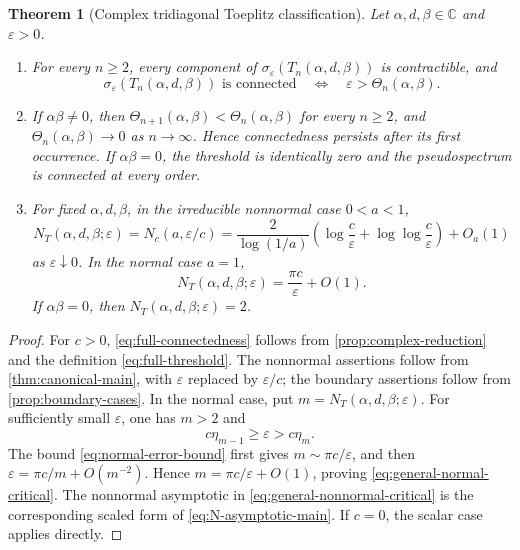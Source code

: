 \documentclass[11pt,a4paper]{article}
\numberwithin{equation}{section}
\newtheorem{theorem}{Theorem}[section]
\newcommand{\C}{\mathbb C}
\begin{document}
\begin{theorem}[Complex tridiagonal Toeplitz classification]
\label{thm:main}
Let \(\alpha,d,\beta\in\C\) and \(\varepsilon>0\).
\begin{enumerate}
\item For every \(n\geq2\), every component of
\(\sigma_\varepsilon(T_n(\alpha,d,\beta))\) is
contractible, and
\begin{equation}\label{eq:full-connectedness}
 \sigma_\varepsilon(T_n(\alpha,d,\beta))\text{ is connected}
 \quad\Longleftrightarrow\quad \varepsilon>\Theta_n(\alpha,\beta).
\end{equation}
\item If \(\alpha\beta\ne0\), then
\(\Theta_{n+1}(\alpha,\beta)<\Theta_n(\alpha,\beta)\) for every \(n\geq2\),
and \(\Theta_n(\alpha,\beta)\to0\) as \(n\to\infty\).  Hence connectedness
persists after its first occurrence.  If \(\alpha\beta=0\), the threshold is
identically zero and the pseudospectrum is connected at every order.
\item For fixed \(\alpha,d,\beta\), in the irreducible nonnormal case
\(0<a<1\),
\begin{equation}\label{eq:general-nonnormal-critical}
 N_T(\alpha,d,\beta;\varepsilon)=N_c(a,\varepsilon/c)
 =\frac{2}{\log(1/a)}
 \left(\log\frac c\varepsilon+
 \log\!\log\frac c\varepsilon\right)+O_a(1)
\end{equation}
as \(\varepsilon\downarrow0\).  In the normal case \(a=1\),
\begin{equation}\label{eq:general-normal-critical}
 N_T(\alpha,d,\beta;\varepsilon)
 =\frac{\pi c}{\varepsilon}+O(1).
\end{equation}
If \(\alpha\beta=0\), then \(N_T(\alpha,d,\beta;\varepsilon)=2\).
\end{enumerate}
\end{theorem}

\begin{proof}
For \(c>0\), \eqref{eq:full-connectedness} follows from
\cref{prop:complex-reduction} and the definition
\eqref{eq:full-threshold}.  The nonnormal assertions follow from
\cref{thm:canonical-main}, with \(\varepsilon\) replaced by
\(\varepsilon/c\); the boundary assertions follow from
\cref{prop:boundary-cases}.  In the normal case, put
\(m=N_T(\alpha,d,\beta;\varepsilon)\).  For sufficiently small
\(\varepsilon\), one has \(m>2\) and
\[
 c\eta_{m-1}\geq\varepsilon>c\eta_m.
\]
The bound \eqref{eq:normal-error-bound} first gives
\(m\sim\pi c/\varepsilon\), and then
\(\varepsilon=\pi c/m+O(m^{-2})\).  Hence
\(m=\pi c/\varepsilon+O(1)\), proving
\eqref{eq:general-normal-critical}.  The nonnormal asymptotic in
\eqref{eq:general-nonnormal-critical} is the corresponding scaled form of
\eqref{eq:N-asymptotic-main}.  If \(c=0\), the scalar case applies directly.
\end{proof}
\end{document}
